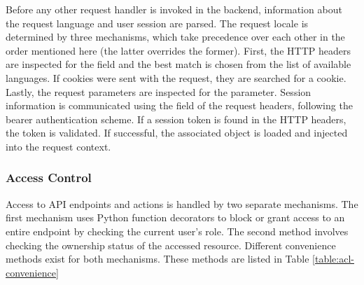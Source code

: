     Before any other request handler is invoked in the backend,
    information about the request language and user session are parsed.
    The request locale is determined by three mechanisms, which take
    precedence over each other in the order mentioned here
    (the latter overrides the former). First, the HTTP headers
    are inspected for the  field and the best
    match is chosen from the list of available languages.
    If cookies were sent with the request, they are searched for
    a  cookie. Lastly, the request parameters
    are inspected for the  parameter.
    Session information is communicated using the 
    field of the request headers, following the bearer authentication scheme.
    If a session token is found in the HTTP headers, the token is validated.
    If successful, the associated  object is loaded and
    injected into the request context.    

    \subsubsection{Access Control}
        Access to API endpoints and actions is handled by two separate mechanisms.
        The first mechanism uses Python function decorators to
        block or grant access to an entire endpoint by checking the
        current user's role. The second method involves checking the
        ownership status of the accessed resource.
        Different convenience methods exist for both mechanisms. These methods are listed in Table 
        \ref{table:acl-convenience}

